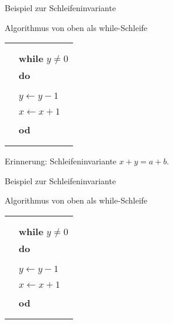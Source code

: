 \begin{frame}{Beispiel zur Schleifeninvariante}

	\begin{exampleblock}{Algorithmus von oben als while-Schleife}
	\small
		\begin{tabular}{rl}
			&\HTB{$x=a \wedge y=b$}\\
			&\HTB{...}\\
			&\textbf{while} $y \neq 0$\\
			&\textbf{do}\\
			&\qquad \HTB{...}\\
			&\qquad \HTB{...}\\
			&\qquad $y \leftarrow y-1$\\
			&\qquad \HTB{...}\\
			&\qquad $x \leftarrow x+1$\\
			&\qquad \HTB{...}\\
			&\textbf{od}\\
			&\HTB{...}\\
			&\HTB{$x=a+b$}\\
		\end{tabular}
		Erinnerung: Schleifeninvariante $x+y=a+b$.
	\end{exampleblock}
\end{frame}

\begin{frame}{Beispiel zur Schleifeninvariante}
	\begin{block}{Algorithmus von oben als while-Schleife}
		\small
		\begin{tabular}{rl}
			&\HTB{$x=a \wedge y=b$}\\
			&\HTB{$x+y=a+b$}\\
			&\textbf{while} $y \neq 0$\\
			&\textbf{do}\\
			&\qquad \HTB{$x+y=a+b \wedge y \neq 0$}\\
			&\qquad \HTB{$x+1+y-1=a+b$}\\
			&\qquad $y \leftarrow y-1$\\
			&\qquad \HTB{$x+1+y=a+b$}\\
			&\qquad $x \leftarrow x+1$\\
			&\qquad \HTB{$x+y=a+b$}\\
			&\textbf{od}\\
			&\HTB{$x+y=a+b  \wedge \neg(y \neq 0)$}\\
			&\HTB{$x=a+b$}\\
		\end{tabular}
	\end{block}
\end{frame}

